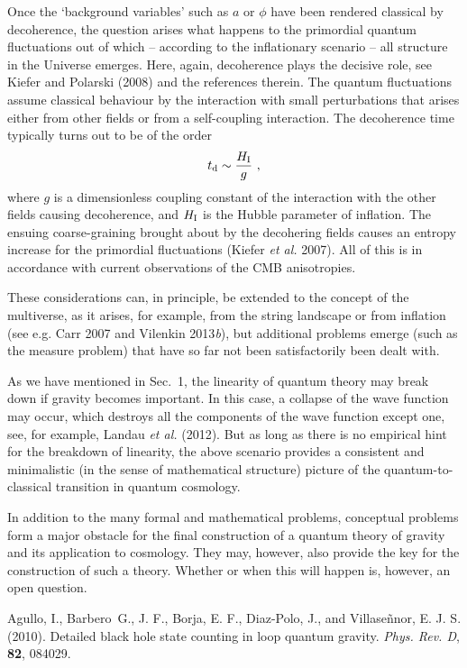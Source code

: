 \documentclass[12pt]{article}
\newcommand{\be}{\begin{equation}}
\newcommand{\ee}{\end{equation}}
\begin{document}
Once the `background variables' such as $a$ or $\phi$ have been
rendered classical by decoherence, the question arises what happens to
the primordial quantum fluctuations out of which -- according to the
inflationary scenario -- all structure in the Universe emerges. 
Here, again, decoherence plays the decisive role, see Kiefer and
Polarski (2008) and the references therein. The quantum fluctuations
assume classical behaviour by the interaction with small perturbations
that arises either from other fields or from a self-coupling interaction.
The decoherence time typically turns out to be of the order
\be
t_{\rm d}\sim \frac{H_{\rm I}}{g}\ ,
\ee
where $g$ is a dimensionless coupling constant of the interaction
with the other fields causing decoherence, and $H_{\rm I}$ is the
Hubble parameter of inflation. The ensuing
coarse-graining brought about by the decohering fields causes an
entropy increase for the primordial fluctuations (Kiefer {\em et al.}
2007). All of this is in accordance with current observations of the CMB
anisotropies. 

These considerations can, in principle, be extended to the concept
of the multiverse, as it arises, for example, from the string
landscape or from inflation (see e.g. Carr 2007 and
Vilenkin 2013{\em b}), but additional problems emerge 
(such as the measure problem) that have
so far not been satisfactorily been dealt with.

As we have mentioned in Sec.~1, the linearity of quantum theory may
break down if gravity becomes important. In this case, a
collapse of the wave function may occur, which destroys all the
components of the 
wave function except one, see, for example, Landau {\em et al.} (2012).
But as long as there is no empirical
hint for the breakdown of linearity, the above scenario provides a
consistent and minimalistic (in the sense of mathematical structure)
picture of the quantum-to-classical 
transition in quantum cosmology.  

In addition to the many formal and mathematical problems, conceptual
problems form 
a major obstacle for the final construction of a quantum theory of
gravity and its application to cosmology. They may, however, also
provide the key 
for the construction of such a theory. Whether or when this will
happen is, however, an open question. 



\bibitem{} Agullo, I., Barbero~G., J. F., Borja, E. F., Diaz-Polo, J.,
and Villase\~{n}nor, E. J. S. (2010). 
Detailed black hole state counting in loop quantum gravity.
{\em Phys. Rev. D}, {\bf 82}, 084029. 
\end{document}
